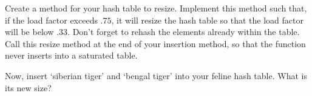 \begin{problem}
Create a method for your hash table to resize.
Implement this method such that, if the load factor exceeds $.75$, it will resize the hash table so that the load factor will be below $.33$.
Don't forget to rehash the elements already within the table.
Call this resize method at the end of your insertion method, so that the function never inserts into a saturated table.

Now, insert `siberian tiger' and `bengal tiger' into your feline hash table. What is its new size? 
\label{prob:Hash resizing}
\end{problem}
\begin{comment}
\section*{Sparse Matrices}
Matrices are powerful tools, but they can take a lot of space in memory.
A $n \times n$ matrix takes $n^2$ places of storage!
If every entry in the matrix is useful information this is fine, but if the matrix is filled with a lot of zeros, that means we are using almost $n^2$ spots in memory to store useless zeros.
Not only does this unnecessarily take up space, it means that during computation we will spend a lot of time adding and multiplying zeros.
That can be a lot of useless computation.
The solution to this is \emph{sparse matrices}.
They are other data structures used to represent a matrix by only storing non-zero entries.

One common way is a dictionary.
The index of the spot in the matrix is the key and the number in that spot is the value.
For example,
\[
\begin{pmatrix}
0 & 0 & 0 & 0 & 0 \\
22 & 0 & 0 & 0 & 0 \\
0 & 0 & 0 & 0 & 0 \\
0 & 0 & 5 & 0 & 0 \\
0 & 0 & 0 & 0 & -4
\end{pmatrix}
\]
would be stored as
\[
\begin{tabular}{|c|l|}
\hline
Key & Value \\
\hline
(1,0) & 22 \\
\hline
(3,2) & 5 \\
\hline
(4,4) & -4 \\
\hline
\end{tabular}
\].

In this case, we stored a 5 by 5 matrix in a dictionary with only 3 key-value pairs.


\end{comment}
